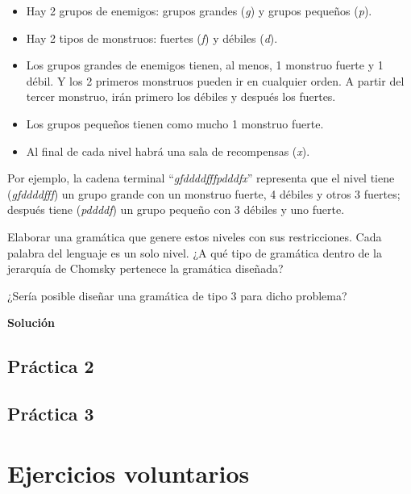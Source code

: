 \documentclass[11pt,a4paper]{article}
\newcommand{\sol}{\textbf{Solución}}
\begin{document}
		\begin{itemize}[noitemsep]
			\item Hay 2 grupos de enemigos: grupos grandes (\textit{g}) y grupos pequeños (\textit{p}).
			\item Hay 2 tipos de monstruos: fuertes (\textit{f}) y débiles (\textit{d}).
			\item Los grupos grandes de enemigos tienen, al menos, 1 monstruo fuerte y 1 débil.
				Y los 2 primeros monstruos pueden ir en cualquier orden. A partir del tercer
				monstruo, irán primero los débiles y después los fuertes.
			\item Los grupos pequeños tienen como mucho 1 monstruo fuerte.
			\item Al final de cada nivel habrá una sala de recompensas (\textit{x}).
		\end{itemize}
	
	\footnotesize
	
	Por ejemplo, la cadena terminal “\textit{gfddddfffpdddfx}” representa que el nivel tiene
	(\textit{gfddddfff}) un grupo grande con un monstruo fuerte, 4 débiles y otros 3 fuertes; 
	después tiene (\textit{pddddf}) un grupo pequeño con 3 débiles y uno fuerte. \par
	
	\normalsize	
	Elaborar una gramática que genere estos niveles con sus restricciones. Cada palabra del 
	lenguaje es un solo nivel. ¿A qué tipo de gramática dentro de la jerarquía de Chomsky 
	pertenece la gramática diseñada? \par
	
	¿Sería posible diseñar una gramática de tipo 3 para dicho problema?\par
	
	\sol \par
	
	\newpage
	\subsection{Práctica 2}
	
	\newpage
	\subsection{Práctica 3}
	
	\newpage
	\section{Ejercicios voluntarios}
\end{document}
